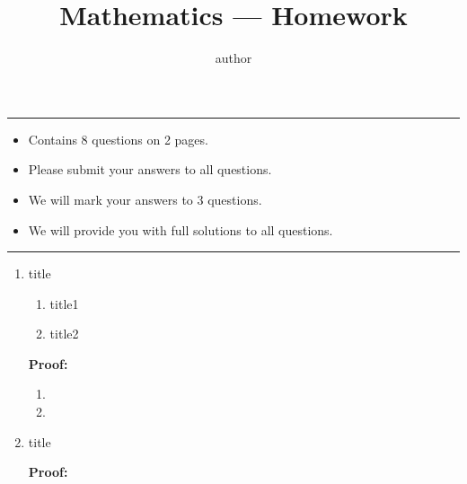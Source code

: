 \documentclass[12pt]{article}
\title{Mathematics  — Homework }
\author{author}
\date{}
\newcommand{\proof}{\par \textbf{Proof:}\par }
\begin{document}
	\maketitle
	\hrule
	\vspace*{.5em}
	\begin{itemize}
		\item  Contains 8 questions on 2 pages.
		
	    \item Please submit your answers to all questions.
	
	    \item We will mark your answers to 3 questions.
	
	    \item We will provide you with full solutions to all questions.
	\end{itemize}
	\vspace*{.5em}
	\hrule
	\vspace*{1em}


\begin{enumerate}
\item title
	\begin{enumerate}
	\item title1 
	\item title2
	\end{enumerate}
	\proof 
	\begin{enumerate}
	\item 
	\item  
	\end{enumerate}

\item title
	\proof

	
\end{enumerate}
\end{document}

